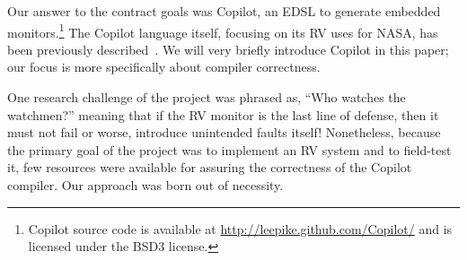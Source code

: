 \documentclass[9pt]{sigplanconf}
\begin{document}
Our answer to the contract goals was Copilot, an EDSL to generate embedded
monitors.\footnote{Copilot source code is available at
  \url{http://leepike.github.com/Copilot/} and is licensed under the BSD3
  license.}  The Copilot language itself, focusing on its RV uses for NASA, has
been previously described~\cite{pike-rv-11}.  We will very briefly introduce
Copilot in this paper; our focus is more specifically about compiler
correctness.

One research challenge of the project was phrased as, ``Who watches the
watchmen?'' meaning that if the RV monitor is the last line of defense, then it
must not fail or worse, introduce unintended faults itself!  Nonetheless,
because the primary goal of the project was to implement an RV system and to
field-test it, few resources were available for assuring the correctness of the
Copilot compiler.  Our approach was born out of necessity.



\end{document}
